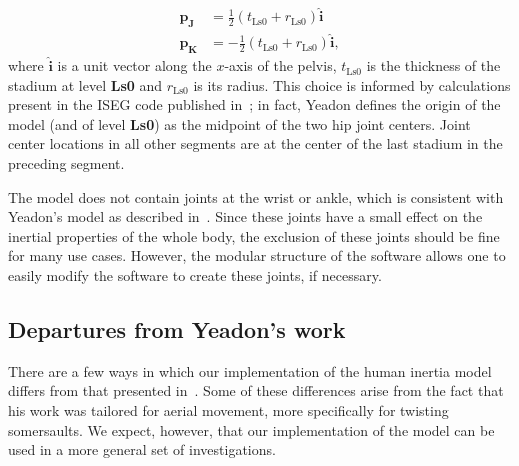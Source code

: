 \documentclass[10pt,a4paper,twocolumn]{article}
\begin{document}
\begin{align}
    \mathbf{p_J} &=
        \frac{1}{2} (t_{\textrm{Ls0}} + r_{\textrm{Ls0}})\hat{\mathbf{i}} \\
    \mathbf{p_K} &=
        -\frac{1}{2} (t_{\textrm{Ls0}} + r_{\textrm{Ls0}})\hat{\mathbf{i}},
\end{align}
where $\hat{\mathbf{i}}$ is a unit vector along the $x$-axis of the pelvis,
$t_{\textrm{Ls0}}$ is the thickness of the stadium at level \textbf{Ls0} and
$r_{\textrm{Ls0}}$ is its radius. This choice is informed by calculations
present in the ISEG code published in~\cite{Yeadon1984a}; in fact, Yeadon
defines the origin of the model (and of level \textbf{Ls0}) as the midpoint of
the two hip joint centers.  Joint center locations in all other segments are at
the center of the last stadium in the preceding segment.

The model does not contain joints at the wrist or ankle, which is consistent
with Yeadon's model as described in~\cite{Yeadon1990e}. Since these joints have
a small effect on the inertial properties of the whole body, the exclusion of
these joints should be fine for many use cases. However, the modular structure
of the software allows one to easily modify the software to create these
joints, if necessary.

\subsection*{Departures from Yeadon's work}

There are a few ways in which our implementation of the human inertia model
differs from that presented in~\cite{Yeadon1990c, Yeadon1990f, Yeadon1990e,
Yeadon1990d}. Some of these differences arise from the fact that his work was
tailored for aerial movement, more specifically for twisting somersaults. We
expect, however, that our implementation of the model can be used in a more
general set of investigations.
\end{document}
